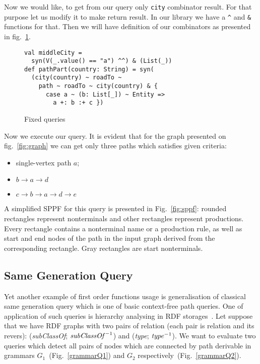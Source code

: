 Now we would like, to get from our query only \lstinline{city} combinator result.
For that purpose let us modify it to make return result.
In our library we have a \lstinline{^} and \lstinline{&} functions for that.
Then we will have definition of our combinators as presented in fig.~\ref{fig:fixedPathQ}.

\begin{figure}[h]
\begin{lstlisting}
val middleCity =
  syn(V(_.value() == "a") ^^) & (List(_))
def pathPart(country: String) = syn(
  (city(country) ~ roadTo ~
    path ~ roadTo ~ city(country) & {
      case a ~ (b: List[_]) ~ Entity =>
        a +: b :+ c })
\end{lstlisting}
\caption{Fixed queries}
\label{fig:fixedPathQ}
\end{figure}

Now we execute our query. It is evident that for the graph presented on fig.~\ref{fig:graph} we can get only three paths which satisfies given criteria:
\begin{itemize}
\item single-vertex path $a$;
\item $b \rightarrow a \rightarrow d$
\item $c \rightarrow b \rightarrow a \rightarrow d \rightarrow e$
\end{itemize}

A simplified SPPF for this query is presented in Fig.~\ref{fig:sppf}: rounded rectangles represent nonterminals and other rectangles represent productions.
Every rectangle contains a nonterminal name or a production rule, as well as start and end nodes of the path in the input graph derived from the corresponding rectangle.
Gray rectangles are start nonterminals.

\subsection{Same Generation Query}

Yet another example of first order functions usage is generalisation of classical same generation query which is one of basic context-free path queries.
One of application of such queries is hierarchy analysing in RDF storages~\cite{CFGonRDF}.
Let suppose that we have RDF graphs with two pairs of relation (each pair is relation and its revers): (\emph{subClassOf}; $\text{\emph{subClassOf}}^{-1}$) and (\emph{type}; $\text{\emph{type}}^{-1}$).
We want to evaluate two queries which detect all pairs of nodes which are connected by path derivable in grammars $G_1$~(Fig.~\ref{grammarQ1}) and $G_2$ respectively~(Fig.~\ref{grammarQ2}).


